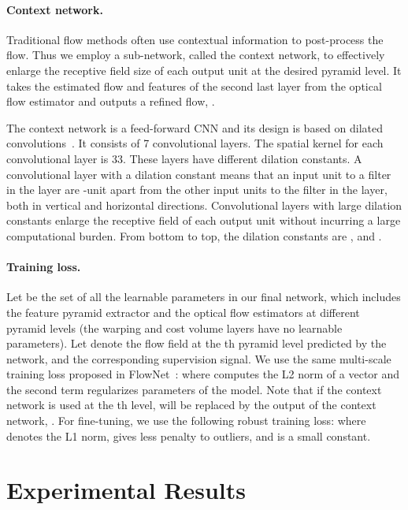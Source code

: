 \documentclass[10pt,journal,cspaper,compsoc]{IEEEtran}
\newcommand{\beforePara}{\vspace{-0em}}
\newcommand{\beforeEqn}{\vspace{-0em}}
\begin{document}
	
	\beforePara
	\paragraph{Context network.}	
	Traditional flow methods often use contextual information to post-process the flow. Thus we employ a sub-network, called the context network, to effectively enlarge the receptive field size of each output unit at the desired pyramid level.  It takes the estimated flow and features of the second last layer from the optical flow estimator and outputs a refined flow, . 
	
	
	The context network is a feed-forward CNN and its	design is based on dilated convolutions~\cite{yu2015multi}. It consists of 7 convolutional layers. The spatial kernel for each convolutional layer is 33. These layers have different dilation constants. A convolutional layer with a dilation constant  means that an input unit to a filter in the layer are -unit apart from the other input units to the filter in the layer, both in vertical and horizontal directions. Convolutional layers with large dilation constants enlarge the receptive field of each output unit without incurring a large computational burden. From bottom to top, the dilation constants are , and . 
	
			
	\paragraph{Training loss.}
	Let  be the set of all the learnable parameters in our final network, which includes the feature pyramid extractor and the optical flow estimators at different pyramid levels (the warping and cost volume layers have no learnable parameters).
	Let  denote the flow field at the th pyramid level predicted by the network, and  the corresponding supervision signal. 
	We use the same multi-scale training loss proposed in FlowNet~\cite{Dosovitskiy:2015Flownet}:
	\beforeEqn
	where  computes the L2 norm of a vector and the second term regularizes parameters of the model. Note that if the context network is used at the th level,  will be replaced by the output of the context network, .
	For fine-tuning, we use the following robust training loss: 
	\beforeEqn
	where  denotes the L1 norm,  gives less penalty to outliers, and  is a small constant. 
	
	
	\section{Experimental Results}
	
\end{document}
